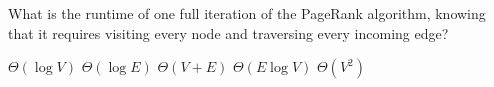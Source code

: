 \documentclass[11pt]{exam}
\begin{document}
\begin{center}
\end{center}

\newpage

\begin{Qu}
	What is the runtime of one full iteration of the PageRank algorithm, knowing that it requires visiting every node and traversing every incoming edge?
	\begin{itemize}
		\aitem $\Theta(\log V)$
		\bitem $\Theta(\log E)$
		\citem $\Theta(V + E)$
		\ditem $\Theta(E \log V)$
		\eitem $\Theta(V^2)$
	\end{itemize}
\end{Qu}
\end{document}
